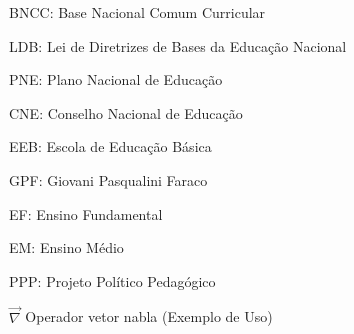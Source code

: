 \listoffigures*
\newpage

\listofquadros*
\cleardoublepage


\listoftables*
\newpage


\begin{siglas}
	\item BNCC: Base Nacional Comum Curricular
	\item LDB:  Lei de Diretrizes de Bases da Educação Nacional
	\item PNE:  Plano Nacional de Educação
	\item CNE:  Conselho Nacional de Educação
    \item EEB:  Escola de Educação Básica
    \item GPF:  Giovani Pasqualini Faraco
    \item EF:   Ensino Fundamental
    \item EM:   Ensino Médio
    \item PPP:  Projeto Político Pedagógico
\end{siglas}
\newpage

\begin{simbolos}
    \item[$ \vec{\nabla} $] Operador vetor nabla (Exemplo de Uso)
    
\end{simbolos}